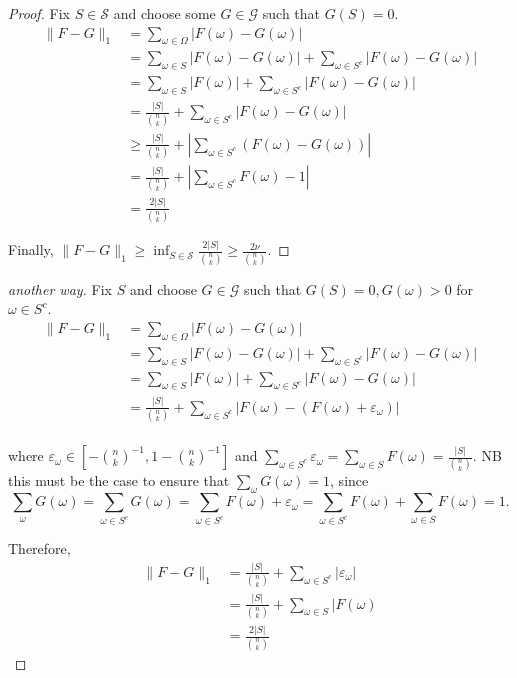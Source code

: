 \documentclass[12pt]{article}
\newcommand{\eps}{\varepsilon}
\begin{document}
\begin{proof}
Fix $S \in \mathcal{S}$ and choose some $G \in \mathcal{G}$ such that $G(S) = 0$.
\begin{align*}
\lVert F - G \rVert_1 &= \sum_{\omega \in \Omega} \lvert F(\omega) - G(\omega) \rvert \\
&= \sum_{\omega \in S} \lvert F(\omega) - G(\omega) \rvert + \sum_{\omega \in S^c} \lvert F(\omega) - G(\omega) \rvert\\
&= \sum_{\omega \in S} \lvert F(\omega) \rvert + \sum_{\omega \in S^c} \lvert F(\omega) - G(\omega) \rvert\\
&= \frac{ \lvert S \rvert}{{n \choose k}}+ \sum_{\omega \in S^c} \lvert F(\omega) - G(\omega) \rvert\\
&\geq \frac{ \lvert S \rvert}{{n \choose k}}+ \left\lvert\sum_{\omega \in S^c} \left( F(\omega) - G(\omega) \right)\right\rvert\\
&= \frac{ \lvert S \rvert}{{n \choose k}}+ \left\lvert\sum_{\omega \in S^c} F(\omega) - 1 \right\rvert\\
&= \frac{2 \lvert S \rvert}{{n \choose k}}
\end{align*}

Finally, $ \lVert F - G \rVert_1 \geq \inf_{S \in \mathcal{S}} \frac{2 \lvert S \rvert}{{n \choose k}} \geq \frac{2\nu}{{n \choose k}}$.
\end{proof}

\begin{proof}[another way]
Fix $S$ and choose $G \in \mathcal{G}$ such that $G(S) = 0, G(\omega) > 0$ for $\omega \in S^c$.
\begin{align*}
\lVert F - G \rVert_1 &= \sum_{\omega \in \Omega} \lvert F(\omega) - G(\omega) \rvert \\
&= \sum_{\omega \in S} \lvert F(\omega) - G(\omega) \rvert + \sum_{\omega \in S^c} \lvert F(\omega) - G(\omega) \rvert\\
&= \sum_{\omega \in S} \lvert F(\omega) \rvert + \sum_{\omega \in S^c} \lvert F(\omega) - G(\omega) \rvert\\
&= \frac{ \lvert S \rvert}{{n \choose k}}+ \sum_{\omega \in S^c} \lvert F(\omega) - (F(\omega) + \eps_\omega) \rvert\\
\end{align*}

\noindent where $\eps_\omega \in [ - {n \choose k}^{-1}, 1 - {n\choose k}^{-1}]$ and $\sum_{\omega \in S^c} \eps_\omega = \sum_{\omega \in S} F(\omega) =  \frac{ \lvert S \rvert}{{n \choose k}}$.
NB this must be the case to ensure that $\sum_{\omega} G(\omega) = 1$, since
$$\sum_{\omega} G(\omega) =\sum_{\omega\in S^c} G(\omega) = \sum_{\omega\in S^c} F(\omega) + \eps_\omega = \sum_{\omega\in S^c} F(\omega) + \sum_{\omega\in S} F(\omega) = 1.$$

Therefore,
\begin{align*}
\lVert F - G \rVert_1 &= \frac{ \lvert S \rvert}{{n \choose k}}+ \sum_{\omega \in S^c} \lvert \eps_\omega \rvert\\
&=  \frac{ \lvert S \rvert}{{n \choose k}}+ \sum_{\omega \in S} \lvert F(\omega) \\
&= \frac{2 \lvert S \rvert}{{n \choose k}}
\end{align*}
\end{proof}
\end{document}
